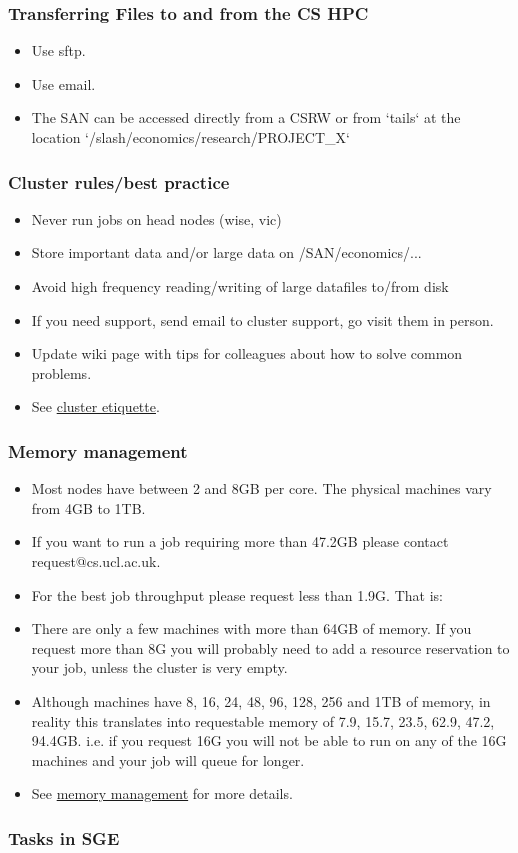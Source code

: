 \documentclass{beamer}
\begin{document}
\begin{frame}
\frametitle{Transferring Files to and from the CS HPC}
\begin{itemize}
\item Use sftp.
\item Use email.
\item The SAN can be accessed directly from a CSRW or from `tails` at the location `/slash/economics/research/PROJECT\_X`
\end{itemize}
\end{frame}

\begin{frame}
\frametitle{Cluster rules/best practice}
\begin{itemize}
\item Never run jobs on head nodes (wise, vic)
\item Store important data and/or large data on /SAN/economics/...
\item Avoid high frequency reading/writing of large datafiles to/from disk
\item If you need support, send email to cluster support, go visit them in person.
\item Update wiki page with tips for colleagues about how to solve common problems.
\item See \textcolor{blue}{ \href{http://hpc.cs.ucl.ac.uk/cluster\_etiquette}{cluster etiquette}}.
\end{itemize}
\end{frame}

\begin{frame}
\frametitle{Memory management}
\begin{itemize}
\item Most nodes have between 2 and 8GB per core.  The physical machines vary from 4GB to 1TB.
\item If you want to run a job requiring more than 47.2GB please contact request@cs.ucl.ac.uk.
\item For the best job throughput please request less than 1.9G. That is:
\item There are only a few machines with more than 64GB of memory. If you request more than 8G you will probably need to add a resource reservation to your job, unless the cluster is very empty.
\item Although machines have 8, 16, 24, 48, 96, 128, 256 and 1TB of memory, in reality this translates into requestable memory of 7.9, 15.7, 23.5, 62.9, 47.2, 94.4GB. i.e. if you request 16G you will not be able to run on any of the 16G machines and your job will queue for longer.
\item See \textcolor{blue}{ \href{http://hpc.cs.ucl.ac.uk/memory\_managment}{memory management}} for more details.
\end{itemize}
\end{frame}


\begin{frame}
\frametitle{Tasks in SGE}
\end{frame}
\end{document}
